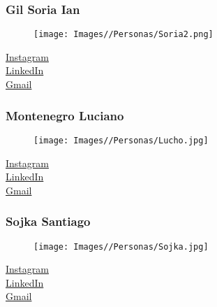 \documentclass{article}
\begin{document}
\subsubsection{Gil Soria Ian}
\begin{minipage}[t]{0.3\textwidth}

\begin{figure}[H]
    \texttt{[image: Images//Personas/Soria2.png]}
\end{figure}

\end{minipage}
\begin{minipage}[t]{0.5\textwidth}
    \vspace{3.5em}
    \href{https://instagram.com/ian_gilsooor}{Instagram} \\[1em]
     \href{https://www.linkedin.com/in/ian-lucas-gil-soria-a8090b2a8?utm_source=share&utm_campaign=share_via&utm_content=profile&utm_medium=android_app}{LinkedIn} \\[1em]
    \href{mailto:ianlucasgilsoria@gmail.com}{Gmail}
\end{minipage}%

\subsubsection{Montenegro Luciano}
\begin{minipage}[t]{0.3\textwidth}

\begin{figure}[H]
    \texttt{[image: Images//Personas/Lucho.jpg]}
\end{figure}

\end{minipage}
\begin{minipage}[t]{0.5\textwidth}
    \vspace{3.5em}
    \href{https://instagram.com/luchito_.montenegro}{Instagram} \\[1em]
    \href{https://www.linkedin.com/in/luciano-montenegro-3215aa304}{LinkedIn} \\[1em]
    \href{mailto:lucianomontenegro1021@gmail.com}{Gmail}
\end{minipage}%

\subsubsection{Sojka Santiago}
\begin{minipage}[t]{0.3\textwidth}
\begin{figure}[H]
    \texttt{[image: Images//Personas/Sojka.jpg]}
\end{figure}
\end{minipage}
\begin{minipage}[t]{0.5\textwidth}
    \vspace{3.5em}
    \href{https://instagram.com/sojkaa.sant}{Instagram} \\[1em]
    \href{https://www.linkedin.com/in/santiago-sojka-817198271/}{LinkedIn} \\[1em]
    \href{mailto:santiagosojka@gmail.com}{Gmail}
\end{minipage}%
\end{document}
